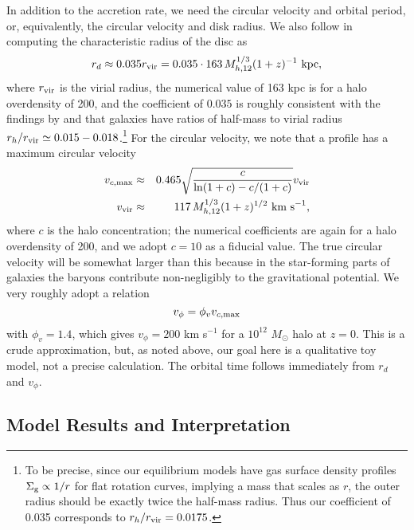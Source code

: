 \documentclass[useAMS,usenatbib]{mn2e}
\begin{document}
In addition to the accretion rate, we need the circular velocity and orbital period, or, equivalently, the circular velocity and disk radius. We also follow \citet{forbes14a} in computing the characteristic radius of the disc as
\begin{equation}
r_d \approx 0.035 r_{\rm vir} = 0.035 \cdot 163 \, M_{h,12}^{1/3}(1+z)^{-1}\mbox{ kpc},
\end{equation}
where $r_{\rm vir}$ is the virial radius, the numerical value of 163 kpc is for a halo overdensity of 200, and the coefficient of $0.035$ is roughly consistent with the findings by \citet{kravtsov13a} and \citet{somerville18a} that galaxies have ratios of half-mass to virial radius $r_h/r_{\rm vir} \simeq 0.015 - 0.018$.\footnote{To be precise, since our equilibrium models have gas surface density profiles $\Sigma_{\rm g} \propto 1/r$ for flat rotation curves, implying a mass that scales as $r$, the outer radius should be exactly twice the half-mass radius. Thus our coefficient of 0.035 corresponds to $r_h/r_{\rm vir} = 0.0175$.} For the circular velocity, we note that a \citet{navarro97a} profile has a maximum circular velocity \citep{mo10a}
\begin{eqnarray}
v_{c,\rm max} & \approx & 0.465\sqrt{\frac{c}{\ln(1+c)-c/(1+c)}} v_{\rm vir} \\
v_{\rm vir} & \approx & 117 \, M_{h,12}^{1/3} (1+z)^{1/2} \mbox{ km s}^{-1},
\end{eqnarray}
where $c$ is the halo concentration; the numerical coefficients are again for a halo overdensity of 200, and we adopt $c=10$ as a fiducial value. The true circular velocity will be somewhat larger than this because in the star-forming parts of galaxies the baryons contribute non-negligibly to the gravitational potential. We very roughly adopt a relation
\begin{equation}
v_\phi = \phi_v v_{c,\rm max}
\end{equation}
with $\phi_v = 1.4$, which gives $v_\phi = 200$ km s$^{-1}$ for a $10^{12}$ $M_\odot$ halo at $z=0$. This is a crude approximation, but, as noted above, our goal here is a qualitative toy model, not a precise calculation. The orbital time follows immediately from $r_d$ and $v_\phi$.

\subsection{Model Results and Interpretation}
\end{document}
